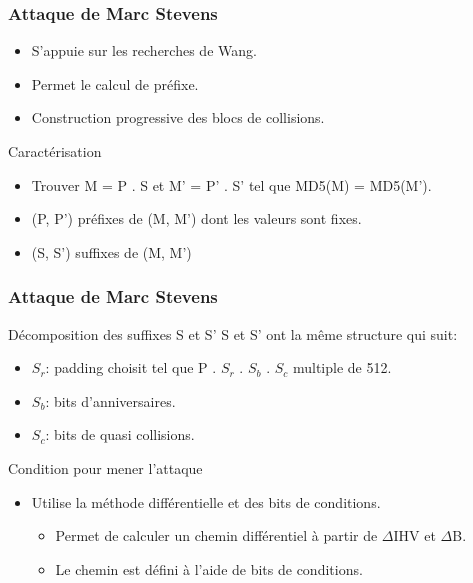 	\begin{frame}
		\frametitle{Attaque de Marc Stevens}
		\begin{block}{}
		  \begin{itemize}
		  \item S'appuie sur les recherches de Wang.
		  \item Permet le calcul de pr\'efixe.
		  \item Construction progressive des blocs de collisions.
		  \end{itemize}
		\end{block}
	
		\begin{block}{Caract\'erisation}
		  \begin{itemize}
		  \item Trouver M = P . S et  M' = P' . S' tel que MD5(M) = MD5(M').
		  \item (P, P') pr\'efixes de (M, M') dont les valeurs sont fixes.
		  \item (S, S') suffixes de (M, M')
		  \end{itemize}
		\end{block}
	\end{frame}

	
	\begin{frame}
		\frametitle{Attaque de Marc Stevens}
		\begin{block}{D\'ecomposition des suffixes S et S'}
		S et S' ont la m\^eme structure qui suit:
		  \begin{itemize}
		  \item $S_r$: padding choisit tel que P . $S_r$ . $S_b$ . $S_c$ multiple de 512.
		  \item $S_b$: bits d'anniversaires.
		  \item $S_c$: bits de quasi collisions.
		  \end{itemize}
		\end{block}
		
		\begin{block}{Condition pour mener l'attaque}
		  \begin{itemize}
		  \item Utilise la m\'ethode diff\'erentielle et des bits de conditions.
		    \begin{itemize}
		    \item Permet de calculer un chemin diff\'erentiel \`a partir de $\Delta$IHV et $\Delta$B.
		    \item Le chemin est d\'efini \`a l'aide de bits de conditions.
		    \end{itemize}
		  \end{itemize}
		\end{block}
	\end{frame}
			
